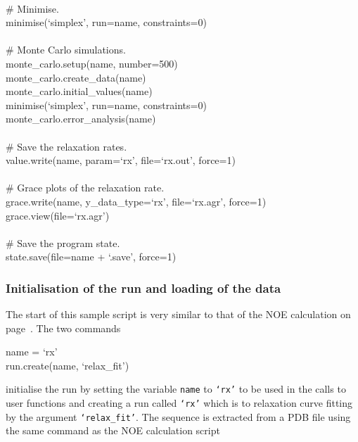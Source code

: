 \begin{exampleenv}
 \\
\# Minimise. \\
minimise(`simplex', run=name, constraints=0) \\
 \\
\# Monte Carlo simulations. \\
monte\_carlo.setup(name, number=500) \\
monte\_carlo.create\_data(name) \\
monte\_carlo.initial\_values(name) \\
minimise(`simplex', run=name, constraints=0) \\
monte\_carlo.error\_analysis(name) \\
 \\
\# Save the relaxation rates. \\
value.write(name, param=`rx', file=`rx.out', force=1) \\
 \\
\# Grace plots of the relaxation rate. \\
grace.write(name, y\_data\_type=`rx', file=`rx.agr', force=1) \\
grace.view(file=`rx.agr') \\
 \\
\# Save the program state. \\
state.save(file=name + `.save', force=1) \\
\end{exampleenv}


\subsubsection{Initialisation of the run and loading of the data}

The start of this sample script is very similar to that of the NOE calculation on page~\pageref{NOE initialisation}.  The two commands

\begin{exampleenv}
name = `rx' \\
run.create(name, `relax\_fit') \\
\end{exampleenv}

initialise the run by setting the variable \texttt{name} to \texttt{`rx'} to be used in the calls to user functions and creating a run called \texttt{`rx'} which is to relaxation curve fitting by the argument \texttt{`relax\_fit'}.  The sequence is extracted from a PDB file using the same command as the NOE calculation script

